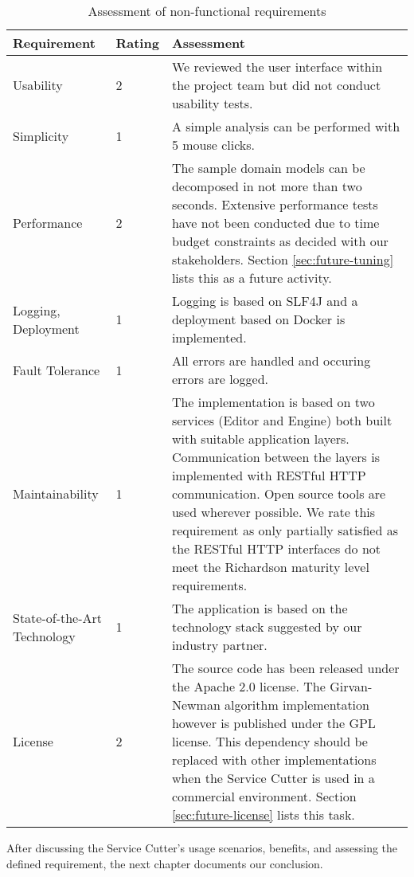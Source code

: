 \begin{table}[H]
	\centering
	\caption{Assessment of non-functional requirements}
	\label{tab:conclusionNonFunctional}
	\begin{tabular}{|p{100pt}|l|p{250pt}|}
	\hline \textbf{Requirement} & \textbf{Rating} & \textbf{Assessment} \\ 
	\hline Usability & 2 & We reviewed the user interface within the project team but did not conduct usability tests. \\
	\hline Simplicity & 1 & A simple analysis can be performed with 5 mouse clicks. \\
	\hline Performance & 2 & The sample domain models can be decomposed in not more than two seconds. Extensive performance tests have not been conducted due to time budget constraints as decided with our stakeholders. Section \ref{sec:future-tuning} lists this as a future activity. \\
	\hline Logging, \newline Deployment & 1 & Logging is based on SLF4J and a deployment based on Docker is implemented. \\
	\hline Fault Tolerance & 1 & All errors are handled and occuring errors are logged. \\
	\hline Maintainability & 1 & The implementation is based on two services (Editor and Engine) both built with suitable application layers. Communication between the layers is implemented with RESTful HTTP communication. Open source tools are used wherever possible. We rate this requirement as only partially satisfied as the RESTful HTTP interfaces do not meet the Richardson maturity level requirements.  \\
	\hline State-of-the-Art Technology & 1 & The application is based on the technology stack suggested by our industry partner. \\
	\hline License & 2 & The source code has been released under the Apache 2.0 license. The Girvan-Newman algorithm implementation however is published under the GPL license. This dependency should be replaced with other implementations when the Service Cutter is used in a commercial environment. Section \ref{sec:future-license} lists this task. \\
	\hline 
	\end{tabular} 
\end{table}

After discussing the Service Cutter's usage scenarios, benefits, and assessing the defined requirement, the next chapter documents our conclusion.

